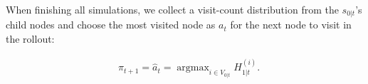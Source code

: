\documentclass{article}
\DeclareMathOperator*{\argmax}{argmax}
\begin{document}

When finishing all simulations, we collect a visit-count distribution from the $s_{0|t}$'s child nodes and choose the most visited node as $a_t$ for the next node to visit in the rollout:

\begin{align}\label{simulation result}
    & \pi_{t+1}=\hat{a}_t = \argmax_{i \in V_{0|t}} H^{(i)}_{1|t}.
\end{align}
\end{document}
